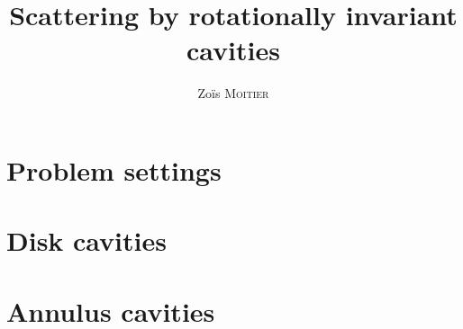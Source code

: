 \documentclass[12pt,a4paper]{article}
\title{Scattering by rotationally invariant cavities}
\author{Zoïs \textsc{Moitier}}
\begin{document}
\maketitle

\tableofcontents

\section{Problem settings}

\section{Disk cavities}

\section{Annulus cavities}
\end{document}
